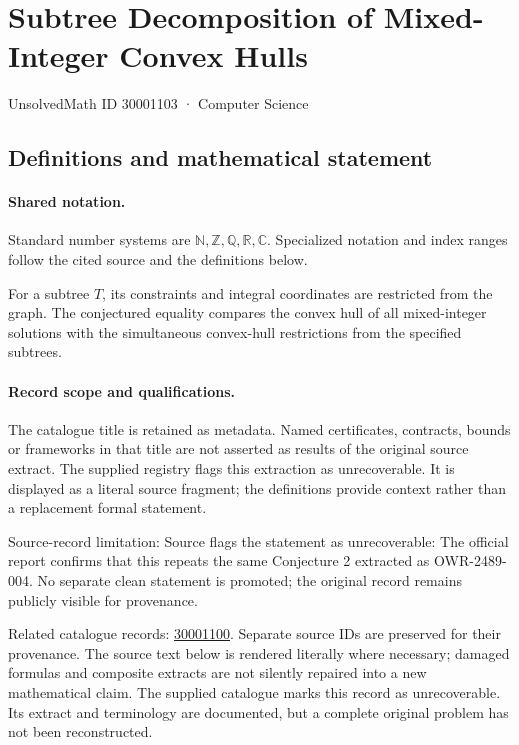 \documentclass[11pt]{article}
\begin{document}
\setcounter{section}{30001102}
\section{Subtree Decomposition of Mixed-Integer Convex Hulls}\label{30001103}
{\small\sffamily UnsolvedMath ID 30001103 · Computer Science}
\subsection{Definitions and mathematical statement}

\paragraph{Shared notation.}Standard number systems are $\mathbb N,\mathbb Z,\mathbb Q,\mathbb R,\mathbb C$. Specialized notation and index ranges follow the cited source and the definitions below.


For a subtree $T$, its constraints and integral coordinates are restricted from the graph. The conjectured equality compares the convex hull of all mixed-integer solutions with the simultaneous convex-hull restrictions from the specified subtrees.
\paragraph{Record scope and qualifications.}
The catalogue title is retained as metadata. Named certificates, contracts, bounds or frameworks in that title are not asserted as results of the original source extract.
The supplied registry flags this extraction as unrecoverable. It is displayed as a literal source fragment; the definitions provide context rather than a replacement formal statement.

Source-record limitation: Source flags the statement as unrecoverable: The official report confirms that this repeats the same Conjecture 2 extracted as OWR-2489-004. No separate clean statement is promoted; the original record remains publicly visible for provenance.

Related catalogue records: \href{https://mehmetmars7.github.io/Erdosproblems-llm-hunter/problem.html?type=open_problems&id=30001100}{30001100}. Separate source IDs are preserved for their provenance.
The source text below is rendered literally where necessary; damaged formulas and composite extracts are not silently repaired into a new mathematical claim.
The supplied catalogue marks this record as unrecoverable. Its extract and terminology are documented, but a complete original problem has not been reconstructed.
\end{document}
